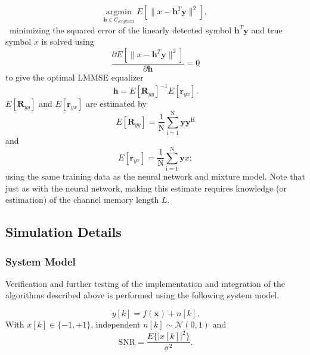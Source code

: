 \documentclass[12pt,a4paper]{article}
\begin{document}
\begin{equation*}\label{mmse}
\underset{\mathbf{\mathbf{h}} \in \textit{$\mathcal{C}_{lengthx1}$}}{\text{argmin}} \;
 E[\|x-\mathbf{h}^T\mathbf{y}\|^2],
\end{equation*}\
minimizing the squared error of the linearly detected symbol $\mathbf{h}^T\mathbf{y}$ and true symbol $x$ 
is solved using
\begin{equation*}\label{mmse}
\frac{\partial  E[\|x-\mathbf{h}^T\mathbf{y}\|^2]}{\partial \mathbf{h} } = 0
\end{equation*}
to give the optimal LMMSE equalizer
\begin{equation*}\label{mmse}
\mathbf{h} = E[\mathbf{R}_{yy}]^{-1}E[\mathbf{r}_{yx}].
\end{equation*}
$E[\mathbf{R}_{yy}]$ and $E[\mathbf{r}_{yx}]$ are estimated by
\begin{equation*}\label{mmse}
 E[\mathbf{R}_{yy}]= \frac{1}{\mathrm{N}}\sum_{\mathrm{i=1}}^{\mathrm{N}}
\mathbf{y}\mathbf{y^{\mathrm{H}}} 
 \end{equation*}
 and
\begin{equation*}\label{mmse}
E[\mathbf{r}_{yx}]= \frac{1}{\mathrm{N}}\sum_{\mathrm{i=1}}^{\mathrm{N}}
\mathbf{y}x
;
 \end{equation*}
 using the same training data as the neural network and mixture model. 
Note that just as with the neural network, making this estimate requires knowledge (or estimation) of the channel memory length $L$.


\subsection{Simulation Details}
\subsubsection{System Model}
Verification and further testing of the implementation and integration of the algorithms described above is performed using the following system model.

%

\begin{equation*}
y[k] = f(\mathbf{x}) + n[k].
\end{equation*}
With $x[k] \in \{ -1, +1\}$, independent $n[k]\sim \mathcal{N}(0,1)$ and 
\begin{equation*}
\text{SNR} = \frac{E\{|x[k]|^2\}}{\sigma^2}.
\end{equation*}
\end{document}
